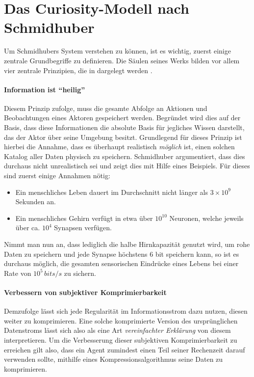 
\section{Das Curiosity-Modell nach Schmidhuber}
\label{sec:Curiosity_Schmidhuber}
Um Schmidhubers System verstehen zu können, ist es wichtig, zuerst einige zentrale Grundbegriffe zu definieren.
Die Säulen seines Werks bilden vor allem vier zentrale Prinzipien, die in  dargelegt werden \cite{curiosity_schmidhuber}.


\paragraph{Information ist ``heilig''}
\label{sec:Information_Heilig}
Diesem Prinzip zufolge, muss die gesamte Abfolge an Aktionen und Beobachtungen eines Aktoren gespeichert werden. Begründet wird dies auf der Basis, dass diese Informationen die absolute Basis für jegliches Wissen darstellt, das der Aktor über seine Umgebung besitzt. 
Grundlegend für dieses Prinzip ist hierbei die Annahme, dass es überhaupt realistisch \emph{möglich} ist, einen solchen Katalog aller Daten physisch zu speichern.
Schmidhuber argumentiert, dass dies durchaus nicht unrealistisch sei und zeigt dies mit Hilfe eines Beispiels. 
Für dieses sind zuerst einige Annahmen nötig: 
\begin{itemize}
    \item Ein menschliches Leben dauert im Durchschnitt nicht länger als \(3\times10^9\) Sekunden an.
    \item Ein menschliches Gehirn verfügt in etwa über \(10^{10}\) Neuronen, welche jeweils über ca. \(10^{4}\) Synapsen verfügen.
\end{itemize}
Nimmt man nun an, dass lediglich die halbe Hirnkapazität genutzt wird, um rohe Daten zu speichern und jede Synapse höchstens 6 bit speichern kann, so ist es durchaus möglich, die gesamten sensorischen Eindrücke eines Lebens bei einer Rate von \(10^5\, \textit{bits/s}\) zu sichern.

\paragraph{Verbessern von subjektiver Komprimierbarkeit}
\label{sec:Komprimierbarkeit_verbessern}
Demzufolge lässt sich jede Regularität im Informationsstrom dazu nutzen, diesen weiter zu komprimieren. Eine solche komprimierte Version des ursprünglichen Datenstroms lässt sich also als eine Art \emph{vereinfachter Erklärung} von diesem interpretieren. Um die Verbesserung dieser subjektiven Komprimierbarkeit zu erreichen gilt also, dass ein Agent zumindest einen Teil seiner Rechenzeit darauf verwenden sollte, mithilfe eines Kompressionsalgorithmus seine Daten zu komprimieren.


